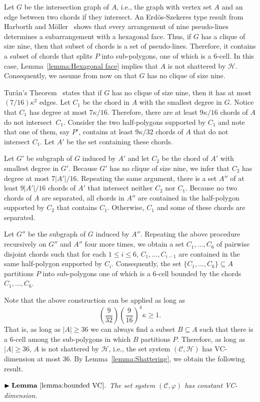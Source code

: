 \documentclass[a4paper,UKenglish]{lipics}
\begin{document}
Let $G$ be the intersection graph of $A$, i.e., the graph with vertex set $A$ and an edge between two chords if they intersect. An Erd\"os-Szekeres type result from Harborth and M\"oller~\cite{harborth1993esther} shows that every arrangement of nine pseudo-lines determines a subarrangement with a hexagonal face.
Thus, if $G$ has a clique of size nine, then that subset of chords is a set of pseudo-lines. Therefore, it contains a subset of chords that splits $P$ into sub-polygons, one of which is a $6$-cell. 
In this case, Lemma~\ref{lemma:Hexagonal face} implies that $A$ is not shattered by $\mathcal H$.
Consequently, we assume from now on that $G$ has no clique of size nine. 

Tur\'an's Theorem~\cite{turan1941extremal} states that if $G$ has no clique of size nine, then it has at most $(7/16)\kappa^2$ edges.
Let $C_1$ be the chord in $A$ with the smallest degree in $G$. Notice that $C_1$ has degree at most $7 \kappa/16$.
Therefore, there are at least $9 \kappa/16$ chords of $A$ do not intersect~$C_1$. 
Consider the two half-polygons supported by $C_1$ and note that one of them, say $P'$, contains at least $9 \kappa/32$ chords of $A$ that do not intersect $C_1$. Let $A'$ be the set containing these chords.

Let $G'$ be subgraph of $G$ induced by $A'$ and let $C_2$ be the chord of $A'$ with smallest degree in $G'$.
Because $G'$ has no clique of size nine, we infer that $C_2$ has degree at most $7|A'|/16$.
Repeating the same argument, there is a set $A''$ of at least $9 |A'| /16$ chords of $A'$ that intersect neither $C_2$ nor $C_1$.
Because no two chords of $A$ are separated, all chords in $A''$ are contained in the half-polygon supported by $C_2$ that contains $C_1$. Otherwise, $C_1$ and some of these chords are separated.

Let $G''$ be the subgraph of $G$ induced by $A''$. Repeating the above procedure recursively on $G''$ and $A''$ four more times, we obtain a set $C_1, \ldots, C_6$ of pairwise disjoint chords such that for each $1\leq i\leq 6$, $C_1, \ldots, C_{i-1}$ are contained in the same half-polygon supported by $C_i$.
Consequently, the set $\{C_1, \ldots, C_6\}\subseteq A$ partitions $P$ into sub-polygons one of which is a 6-cell bounded by the chords $C_1, \ldots, C_6$.

Note that the above construction can be applied as long as 
$$\left(\frac{9}{32}\right) \left(\frac{9}{16}\right)^4\kappa \geq 1.$$ 
That is, as long as $|A| \geq 36$ we can always find a subset $B\subseteq A$ such that there is a $6$-cell among the sub-polygons in which $B$ partitions $P$. 
Therefore, as long as $|A| \geq 36$, $A$ is not shattered by $\mathcal H$, i.e., the set system $(\mathcal C, \mathcal H)$ has VC-dimension at most 36.
By Lemma~\ref{lemma:Shattering}, we obtain the following result.

\vspace{.1in}
\noindent $\blacktriangleright \mathbf{Lemma~\ref{lemma:bounded VC}.}$ 
\emph{The set system $(\mathcal C, \varphi)$ has constant VC-dimension.
}
\end{document}
